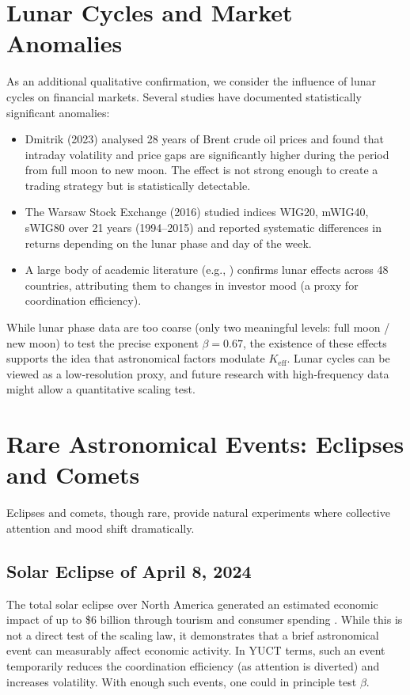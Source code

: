 \documentclass[11pt,a4paper]{article}
\newcommand{\Keff}{K_{\mathrm{eff}}}
\theoremstyle{remark}
\begin{document}
	\section{Lunar Cycles and Market Anomalies}
	\label{sec:lunar}
	
	As an additional qualitative confirmation, we consider the influence of lunar cycles on financial markets. Several studies have documented statistically significant anomalies:
	\begin{itemize}
		\item Dmitrik (2023) \cite{Dmitrik2023} analysed 28 years of Brent crude oil prices and found that intraday volatility and price gaps are significantly higher during the period from full moon to new moon. The effect is not strong enough to create a trading strategy but is statistically detectable.
		\item The Warsaw Stock Exchange (2016) \cite{WSE2016} studied indices WIG20, mWIG40, sWIG80 over 21 years (1994–2015) and reported systematic differences in returns depending on the lunar phase and day of the week.
		\item A large body of academic literature (e.g., \cite{Yuan2015}) confirms lunar effects across 48 countries, attributing them to changes in investor mood (a proxy for coordination efficiency).
	\end{itemize}
	
	While lunar phase data are too coarse (only two meaningful levels: full moon / new moon) to test the precise exponent $\beta = 0.67$, the existence of these effects supports the idea that astronomical factors modulate $\Keff$. Lunar cycles can be viewed as a low‑resolution proxy, and future research with high‑frequency data might allow a quantitative scaling test.
	
	\section{Rare Astronomical Events: Eclipses and Comets}
	\label{sec:rare}
	
	Eclipses and comets, though rare, provide natural experiments where collective attention and mood shift dramatically.
	
	\subsection{Solar Eclipse of April 8, 2024}
	The total solar eclipse over North America generated an estimated economic impact of up to \$6 billion through tourism and consumer spending \cite{BCS2024}. While this is not a direct test of the scaling law, it demonstrates that a brief astronomical event can measurably affect economic activity. In YUCT terms, such an event temporarily reduces the coordination efficiency (as attention is diverted) and increases volatility. With enough such events, one could in principle test $\beta$.
	
\end{document}
